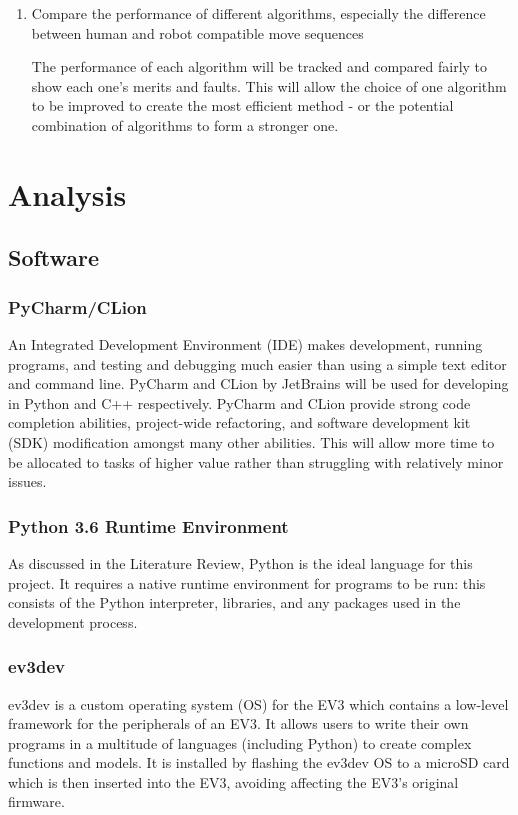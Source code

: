 \documentclass{report}
\begin{document}
\begin{enumerate}
    	\item Compare the performance of different algorithms, especially the difference between human and robot compatible move sequences \par The performance of each algorithm will be tracked and compared fairly to show each one's merits and faults. This will allow the choice of one algorithm to be improved to create the most efficient method - or the potential combination of algorithms to form a stronger one.
    \end{enumerate}
    
    \section{Analysis}
    \subsection{Software}
    
    \subsubsection{PyCharm/CLion}
    An Integrated Development Environment (IDE) makes development, running programs, and testing and debugging much easier than using a simple text editor and command line. PyCharm and CLion by JetBrains \cite{JetBrains} will be used for developing in Python and C++ respectively. PyCharm and CLion provide strong code completion abilities, project-wide refactoring, and software development kit (SDK) modification amongst many other abilities. This will allow more time to be allocated to tasks of higher value rather than struggling with relatively minor issues.
    
	\subsubsection{Python 3.6 Runtime Environment}
    As discussed in the Literature Review, Python is the ideal language for this project. It requires a native runtime environment for programs to be run: this consists of the Python interpreter, libraries, and any packages used in the development process.
    
    \subsubsection{ev3dev}
    ev3dev \cite{Ev3dev.org} is a custom operating system (OS) for the EV3 which contains a low-level framework for the peripherals of an EV3. It allows users to write their own programs in a multitude of languages (including Python) to create complex functions and models. It is installed by flashing the ev3dev OS to a microSD card which is then inserted into the EV3, avoiding affecting the EV3's original firmware.
    
\end{document}
